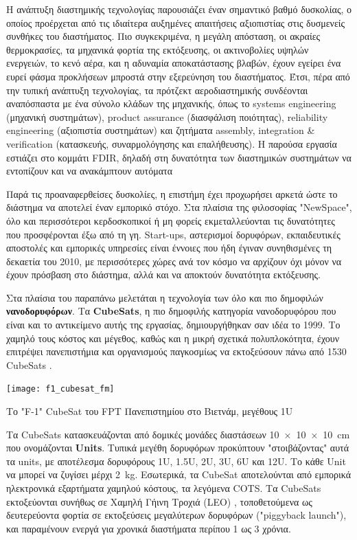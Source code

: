 \documentclass[a4paper,nobib]{tufte-book}
\begin{document}
Η ανάπτυξη διαστημικής τεχνολογίας παρουσιάζει έναν σημαντικό βαθμό δυσκολίας, ο οποίος προέρχεται από τις ιδιαίτερα αυξημένες απαιτήσεις αξιοπιστίας στις δυσμενείς συνθήκες του διαστήματος. Πιο συγκεκριμένα, η μεγάλη απόσταση, οι ακραίες θερμοκρασίες, τα μηχανικά φορτία της εκτόξευσης, οι ακτινοβολίες υψηλών ενεργειών, το κενό αέρα,  και η αδυναμία αποκατάστασης βλαβών, έχουν εγείρει ένα ευρεί φάσμα προκλήσεων μπροστά στην εξερεύνηση του διαστήματος. Έτσι, πέρα από την τυπική ανάπτυξη τεχνολογίας, τα πρότζεκτ αεροδιαστημικής συνδέονται αναπόσπαστα με ένα σύνολο κλάδων της μηχανικής, όπως το systems engineering (μηχανική συστημάτων), product assurance (διασφάλιση ποιότητας), reliability engineering (αξιοπιστία συστημάτων) και ζητήματα assembly, integration \& verification (κατασκευής, συναρμολόγησης και επαλήθευσης). \autocite{smad} Η παρούσα εργασία εστιάζει στο κομμάτι \acf{FDIR}, δηλαδή στη δυνατότητα των διαστημικών συστημάτων να εντοπίζουν και να ανακάμπτουν αυτόματα 

Παρά τις προαναφερθείσες δυσκολίες, η επιστήμη έχει προχωρήσει αρκετά ώστε το διάστημα να αποτελεί έναν εμπορικό στόχο. Στα πλαίσια της φιλοσοφίας "NewSpace", όλο και περισσότεροι κερδοσκοπικοί ή μη φορείς εκμεταλλεύονται τις δυνατότητες που προσφέρονται έξω από τη γη. \autocite{denis_new_space_2020} Start-ups, αστερισμοί δορυφόρων, εκπαιδευτικές αποστολές και εμπορικές υπηρεσίες είναι έννοιες που ήδη έγιναν συνηθισμένες τη δεκαετία του 2010, με περισσότερες χώρες ανά τον κόσμο να αρχίζουν όχι μόνον να έχουν πρόσβαση στο διάστημα, αλλά και να αποκτούν δυνατότητα εκτόξευσης.

Στα πλαίσια του παραπάνω μελετάται η τεχνολογία των όλο και πιο δημοφιλών \textbf{νανοδορυφόρων}. \autocite{sweeting_modern_small_2018a} Τα \textbf{CubeSats}, η πιο δημοφιλής κατηγορία νανοδορυφόρου που είναι και το αντικείμενο αυτής της εργασίας, δημιουργήθηκαν σαν ιδέα το 1999. Το χαμηλό τους κόστος και μέγεθος, καθώς και η μικρή σχετικά πολυπλοκότητα, έχουν επιτρέψει πανεπιστήμια και οργανισμούς παγκοσμίως να εκτοξεύσουν πάνω από \SI{1530}{} CubeSats \autocite{cubesat_database}.

\begin{marginfigure}
	\texttt{[image: f1\_cubesat\_fm]}
	\caption{Το "F-1" CubeSat του FPT Πανεπιστημίου στο Βιετνάμ, μεγέθους 1U}
\end{marginfigure}

Τα CubeSats κατασκευάζονται από δομικές μονάδες διαστάσεων \SI[product-units = single]{10 x 10 x 10}{\centi\metre} που ονομάζονται \textbf{Units}. Τυπικά μεγέθη δορυφόρων προκύπτουν "στοιβάζοντας" αυτά τα units, με αποτέλεσμα δορυφόρους 1U, 1.5U, 2U, 3U, 6U και 12U. Το κάθε Unit να μπορεί να ζυγίσει μέρχι \SI{2}{\kilogram}. Εσωτερικά, τα CubeSat αποτελούνται από εμπορικά ηλεκτρονικά εξαρτήματα χαμηλού κόστους, τα λεγόμενα \acf{COTS}. Τα CubeSats εκτοξεύονται συνήθως σε Χαμηλή Γήινη Τροχιά (\acs{LEO}) \parencite{anthopoulos_orbital_analysis_2020}, τοποθετούμενα ως δευτερεύοντα φορτία σε εκτοξεύσεις μεγαλύτερων δορυφόρων ("piggyback launch"), και παραμένουν ενεργά για χρονικά διαστήματα περίπου 1 ως 3 χρόνια.
\end{document}
